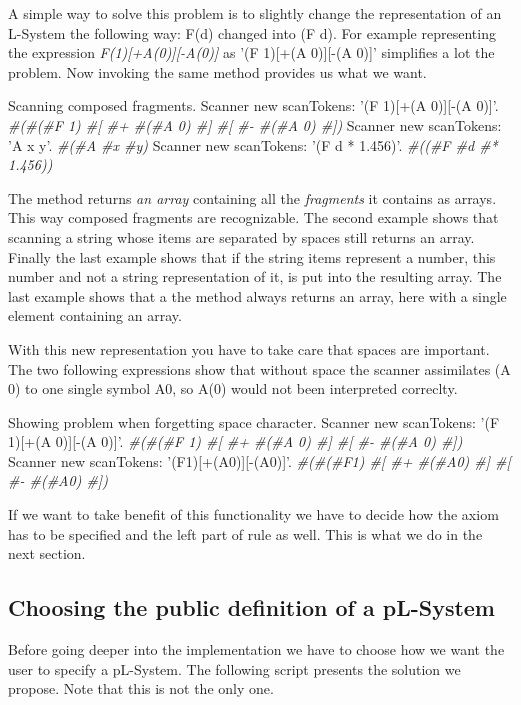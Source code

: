 A simple way to solve this problem is to slightly change the
representation of an L-System the following way: F(d) changed into (F
d). For example representing the expression \emph{F(1)[+A(0)][-A(0)]}
as '(F 1)[+(A 0)][-(A 0)]' simplifies a lot the problem. Now invoking
the same method provides us what we want.

\begin{scriptwithtitle}{Scanning composed fragments.}
Scanner new scanTokens: '(F 1)[+(A 0)][-(A 0)]'.
\emph{\#(\#(\#F 1) \#[ \#+ \#(\#A 0) \#] \#[ \#- \#(\#A 0) \#])}
Scanner new scanTokens: 'A x y'.
\emph{\#(\#A \#x \#y)}
Scanner new scanTokens:  '(F d * 1.456)'.
\emph{\#((\#F \#d \#* 1.456))}
\end{scriptwithtitle}

The method  returns \emph{an array} containing all the
\emph{fragments} it contains as arrays. This way composed fragments are
recognizable. The second example shows that scanning a string whose
items are separated by spaces still returns an array. Finally the last
example shows that if the string items represent a number, this number
and not a string representation of it, is put into the resulting
array. The last example shows that a the method always returns an
array, here with a single element containing an array.

With this new representation you have to take care that spaces are
important.  The two following expressions show that without space the
scanner assimilates (A 0) to one single symbol A0, so A(0) would not
been interpreted correclty.

\begin{scriptwithtitle}{Showing problem when forgetting space character.}
Scanner new scanTokens: '(F 1)[+(A 0)][-(A 0)]'.
\emph{\#(\#(\#F 1) \#[ \#+ \#(\#A 0) \#] \#[ \#- \#(\#A 0) \#])}
Scanner new scanTokens: '(F1)[+(A0)][-(A0)]'.
\emph{#(#(#F1) #[ #+ #(#A0) #] #[ #- #(#A0) #])}
\end{scriptwithtitle}

If we want to take benefit of this functionality we have to decide how
the axiom has to be specified and the left part of rule as well. This
is what we do in the next section.

\subsection{Choosing the public definition of a pL-System}
Before going deeper into the implementation we have to choose how we
want the user to specify a pL-System. The following script presents
the solution we propose. Note that this is not the only one.

